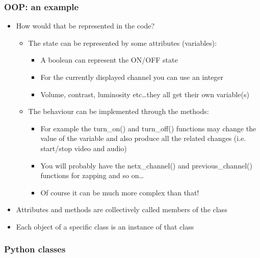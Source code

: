 \documentclass[9pt]{beamer}
\begin{document}
\begin{frame}
  \frametitle{OOP: an example}
 
  \begin{itemize}
    \item How would that be represented in the code?
    \smallskip
      \begin{itemize}
      \item The state can be represented by some \alert{attributes} (variables):
      \begin{itemize}
        \item A boolean can represent the ON/OFF state
        \item For the currently displayed channel you can use an integer
        \item Volume, contrast, luminosity etc\dots they all get their own variable(s)
      \end{itemize}

      \medskip
    
      \item The behaviour can be implemented through the \alert{methods}:
      \smallskip
      \begin{itemize}
        \item For example the turn\_on() and turn\_off() functions may change the value of the variable
              and also produce all the related changes (i.e. start/stop video and audio) 
        \item You will probably have the netx\_channel() and previous\_channel() functions for zapping and so on\dots
        \item Of course it can be much more complex than that!
      \end{itemize}
    \end{itemize}
    
    \medskip
    
    \item Attributes and methods are collectively called \alert{members} of the class
    \medskip
    \item Each object of a specific class is an \alert{instance} of that class
  \end{itemize}

\end{frame}


\begin{frame}
  \frametitle{Python classes}
  
\end{frame}
\end{document}

